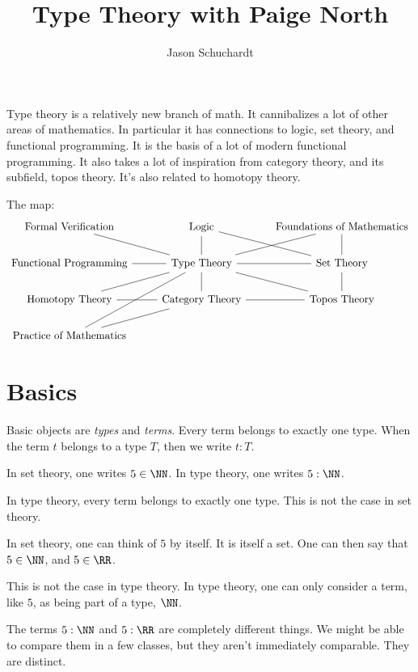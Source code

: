 \documentclass{article}
\title{Type Theory with Paige North}
\author{Jason Schuchardt}
\begin{document}
\maketitle

Type theory is a relatively new branch of math. 
It cannibalizes a lot of other areas of mathematics.
In particular it has connections to logic, set theory,
and functional programming. It is the basis of a lot
of modern functional programming. It also takes a 
lot of inspiration from category theory, and 
its subfield, topos theory. It's also related
to homotopy theory.

The map:
\[
\begin{tikzcd}
\text{Formal Verification} \arrow[rd, no head]                          & \text{Logic} \arrow[rd, no head] \arrow[d, no head]       & \text{Foundations of Mathematics} \arrow[d, no head]                          \\
\text{Functional Programming} \arrow[r, no head]                        & \text{Type Theory} \arrow[r, no head] \arrow[ru, no head] & \text{Set Theory}                                                             \\
\text{Homotopy Theory} \arrow[ru, no head] \arrow[r, no head]           & \text{Category Theory} \arrow[u, no head]                 & \text{Topos Theory} \arrow[lu, no head] \arrow[l, no head] \arrow[u, no head] \\
\text{Practice of Mathematics} \arrow[ru, no head] \arrow[ruu, no head] &                                                           &                                                                              
\end{tikzcd}
\]

\section{Basics}

Basic objects are \emph{types} and \emph{terms}.
Every term belongs to exactly one type. When the term $t$
belongs to a type $T$, then we write $t:T$.

\begin{example}
    In set theory, one writes $5\in\NN$.
    In type theory, one writes $5:\NN$.
\end{example}

In type theory, every term belongs to exactly one type. This
is not the case in set theory.

\begin{example}
    In set theory, one can think of $5$ by itself. It is itself
    a set. One can then say that $5\in \NN$, and $5\in\RR$.

    This is not the case in type theory. In type theory,
    one can only consider a term, like $5$, as being part of 
    a type, $\NN$.

    The terms $5:\NN$ and $5:\RR$ are completely different 
    things. We might be able to compare them in a few classes,
    but they aren't immediately comparable. They are distinct.
\end{example}
\end{document}
